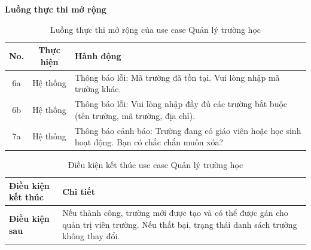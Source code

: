 ﻿\documentclass[../DoAn.tex]{subfiles}
\begin{document}
\noindent\textbf{Luồng thực thi mở rộng}
\begin{table}[H]
\centering
\begin{tabular}{|c|c|p{9cm}|}
\hline
\textbf{No.} & \textbf{Thực hiện} & \textbf{Hành động} \\ \hline
6a & Hệ thống & Thông báo lỗi: Mã trường đã tồn tại. Vui lòng nhập mã trường khác. \\ \hline
6b & Hệ thống & Thông báo lỗi: Vui lòng nhập đầy đủ các trường bắt buộc (tên trường, mã trường, địa chỉ). \\ \hline
7a & Hệ thống & Thông báo cảnh báo: Trường đang có giáo viên hoặc học sinh hoạt động. Bạn có chắc chắn muốn xóa? \\ \hline
\end{tabular}
\caption{Luồng thực thi mở rộng của use case Quản lý trường học}
\label{table:appendix:B.1_ext}
\end{table}
\begin{table}[H]
\centering
\begin{tabular}{|p{4cm}|p{10cm}|}
\hline
\textbf{Điều kiện kết thúc} & \textbf{Chi tiết} \\ \hline
\textbf{Điều kiện sau} & Nếu thành công, trường mới được tạo và có thể được gán cho quản trị viên trường. Nếu thất bại, trạng thái danh sách trường không thay đổi. \\ \hline
\end{tabular}
\caption{Điều kiện kết thúc use case Quản lý trường học}
\label{table:appendix:B.1_post}
\end{table}
\end{document}
